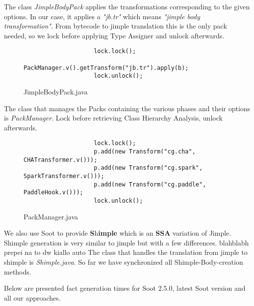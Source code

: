 \documentclass{dithesis}
\begin{document}
	    	The class \textit{JimpleBodyPack} applies the transformations corresponding to the given options. In our case, it applies a \textit{"jb.tr"} which means \textit{"jimple body transformation"}. From bytecode to jimple translation this is the only pack needed, so we lock before applying Type Assigner and unlock afterwards.
	    	\begin{figure}[H]
	            \begin{lstlisting}
			    	lock.lock();
					PackManager.v().getTransform("jb.tr").apply(b);
					lock.unlock();
				\end{lstlisting}
	        \caption{JimpleBodyPack.java}
	        \end{figure}

	    	The class that manages the Packs containing the various phases and their options is \textit{PackManager}. Lock before retrieving Class Hierarchy Analysis, unlock afterwards.
			\begin{figure}[H]
	            \begin{lstlisting}
					lock.lock();
					p.add(new Transform("cg.cha", CHATransformer.v()));
					p.add(new Transform("cg.spark", SparkTransformer.v()));
					p.add(new Transform("cg.paddle", PaddleHook.v()));
					lock.unlock();
				\end{lstlisting}
	        \caption{PackManager.java}
	        \end{figure}

	    	We also use Soot to provide \textbf{S}h\textbf{imple} which is an \textbf{SSA} variation of Jimple. Shimple generation is very similar to jimple but with a few differences. 
	    	blahblabh prepei na to dw kiallo auto
	    	The class that handles the translation from jimple to shimple is \textit{Shimple.java}. So far we have synchronized all Shimple-Body-creation methods.


	Below are presented fact generation times for Soot 2.5.0, latest Soot version and all our approaches.
\end{document}
